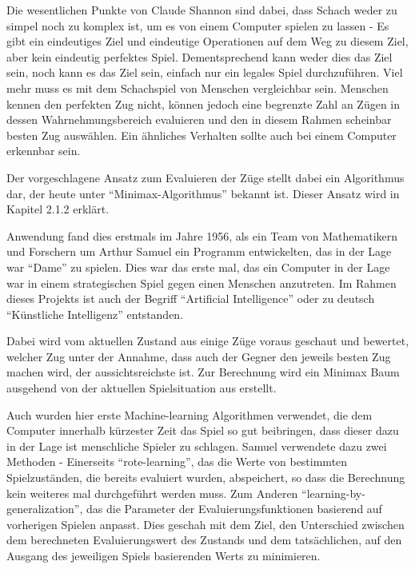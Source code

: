 Die wesentlichen Punkte von Claude Shannon sind dabei, dass Schach weder zu simpel noch zu komplex ist, um es von einem Computer spielen zu lassen - Es gibt ein eindeutiges Ziel und eindeutige Operationen auf dem Weg zu diesem Ziel, aber kein eindeutig perfektes Spiel. Dementsprechend kann weder dies das Ziel sein, noch kann es das Ziel sein, einfach nur ein legales Spiel durchzuführen. Viel mehr muss es mit dem Schachspiel von Menschen vergleichbar sein. Menschen kennen den perfekten Zug nicht, können jedoch eine begrenzte Zahl an Zügen in dessen Wahrnehmungsbereich evaluieren und den in diesem Rahmen scheinbar besten Zug auswählen. Ein ähnliches Verhalten sollte auch bei einem Computer erkennbar sein.

Der vorgeschlagene Ansatz zum Evaluieren der Züge stellt dabei ein Algorithmus dar, der heute unter ``Minimax-Algorithmus'' bekannt ist. Dieser Ansatz wird in Kapitel 2.1.2 erklärt.


Anwendung fand dies erstmals im Jahre 1956, als ein Team von Mathematikern und Forschern um Arthur Samuel ein Programm entwickelten, das in der Lage war ``Dame'' zu spielen. Dies war das erste mal, das ein Computer in der Lage war in einem strategischen Spiel gegen einen Menschen anzutreten. Im Rahmen dieses Projekts ist auch der Begriff ``Artificial Intelligence'' oder zu deutsch ``Künstliche Intelligenz'' entstanden.

Dabei wird vom aktuellen Zustand aus einige Züge voraus geschaut und bewertet, welcher Zug unter der Annahme, dass auch der Gegner den jeweils besten Zug machen wird, der aussichtsreichste ist. Zur Berechnung wird ein Minimax Baum ausgehend von der aktuellen Spielsituation aus erstellt.


Auch wurden hier erste Machine-learning Algorithmen verwendet, die dem Computer innerhalb kürzester Zeit das Spiel so gut beibringen, dass dieser dazu in der Lage ist menschliche Spieler zu schlagen. Samuel verwendete dazu zwei Methoden - Einerseits ``rote-learning'', das die Werte von bestimmten Spielzuständen, die bereits evaluiert wurden, abspeichert, so dass die Berechnung kein weiteres mal durchgeführt werden muss. Zum Anderen ``learning-by-generalization'', das die Parameter der Evaluierungsfunktionen basierend auf vorherigen Spielen anpasst. Dies geschah mit dem Ziel, den Unterschied zwischen dem berechneten Evaluierungswert des Zustands und dem tatsächlichen, auf den Ausgang des jeweiligen Spiels basierenden Werts zu minimieren.

